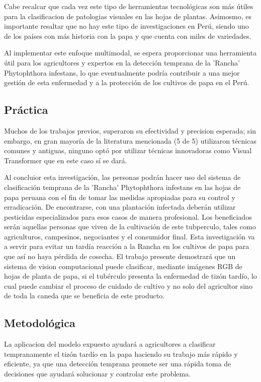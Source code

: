 Cabe recalcar que cada vez este tipo de herramientas tecnológicas son más útiles para la clasificacion de patologias visuales en las hojas de plantas. Asimosmo, es importante resaltar que no hay este tipo de investigaciones en Perú, siendo uno de los países con más historia con la papa y que cuenta con miles de variedades.

Al implementar este enfoque multimodal, se espera proporcionar una herramienta útil para los agricultores y expertos en la detección temprana de la 'Rancha' Phytophthora infestans, lo que eventualmente podría contribuir a una mejor gestión de esta enfermedad y a la protección de los cultivos de papa en el Perú. 
\subsection{Práctica}
Muchos de los trabajos previos, superaron su efectividad y precision esperada; sin embargo, en gran mayoría de la literatura mencionada (5 de 5) utilizaron técnicas comunes y antiguas, ninguno optó por utilizar técnicas innovadoras como Visual Transformer que en este caso sí se dará.


Al concluior esta investigación, las personas podrán hacer uso del sistema de clasificación temprana de la 'Rancha' Phytophthora infestans en las hojas de papa peruana con el fin de tomar las medidas apropiadas para su control y erradicación. De encontrarse, con una plantación infectada deberán utilizar pesticidas especializados para esos casos de manera profesional. Los beneficiados serán aquellas personas que viven de la cultivación de este tubperculo, tales como agriculturos, campesinos, negociantes y el consumidor final. Esta investigación va a servir para evitar un tardía reacción a la Rancha en los cultivos de papa para que así no haya pérdida de cosecha. El trabajo presente demostrará que un sistema de vision computacional puede clasificar, mediante imágenes RGB de hojas de planta de papa, si el tubérculo presenta la enfermedad de tizón tardío, lo cual puede cambiar el proceso de cuidado de cultivo y no solo del agricultor sino de toda la caneda que se beneficia de este producto.

\subsection{Metodológica}
La aplicacion del modelo expuesto ayudará a agricultores a clasificar tempranamente el tizón tardío en la papa haciendo su trabajo más rápido y eficiente, ya que una detección temprana promete ser una rápida toma de decisiones que ayudará solucionar y controlar este problema.

